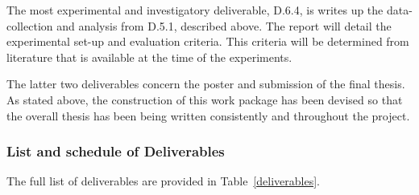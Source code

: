 \documentclass[a4paper]{article}
\begin{document}
The most experimental and investigatory deliverable, D.6.4, is writes up the data-collection and
analysis from D.5.1, described above. The report will detail the experimental set-up and evaluation
criteria. This criteria will be determined from literature that is available at the time of the
experiments.

The latter two deliverables concern the poster and submission of the final thesis. As stated above,
the construction of this work package has been devised so that the overall thesis has been being
written consistently and throughout the project.








\pagebreak

\subsubsection{List and schedule of Deliverables}

The full list of deliverables are provided in Table~\ref{deliverables}.
\end{document}
